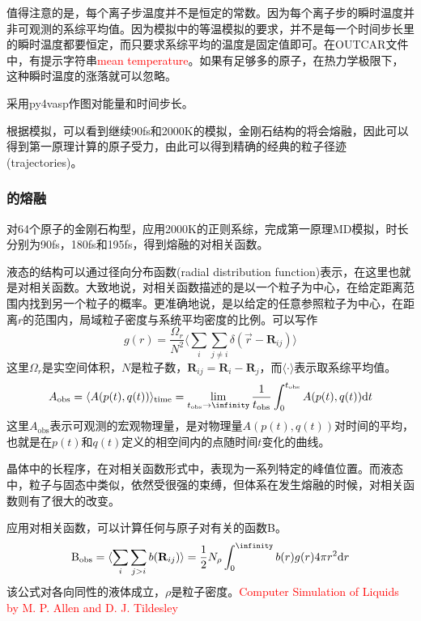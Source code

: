 值得注意的是，每个离子步温度并不是恒定的常数。因为每个离子步的瞬时温度并非可观测的系综平均值。因为模拟中的等温模拟的要求，并不是每一个时间步长里的瞬时温度都要恒定，而只要求系综平均的温度是固定值即可。在\textrm{OUTCAR}文件中，有提示字符串\textcolor{red}{\textrm{mean temperature}}。如果有足够多的原子，在热力学极限下，这种瞬时温度的涨落就可以忽略。

采用\textrm{py4vasp}作图对能量和时间步长。

根据模拟，可以看到继续\textrm{90fs}和\textrm{2000K}的模拟，金刚石结构的将会熔融，因此可以得到第一原理计算的原子受力，由此可以得到精确的经典的粒子径迹\textrm{(trajectories)}。

\subsubsection{的熔融}
对64个原子的金刚石构型，应用\textrm{2000K}的正则系综，完成第一原理\textrm{MD}模拟，时长分别为\textrm{90fs}，\textrm{180fs}和\textrm{195fs}，得到熔融的对相关函数。

液态的结构可以通过径向分布函数\textrm{(radial distribution function)}表示，在这里也就是对相关函数。大致地说，对相关函数描述的是以一个粒子为中心，在给定距离范围内找到另一个粒子的概率。更准确地说，是以给定的任意参照粒子为中心，在距离$r$的范围内，局域粒子密度与系统平均密度的比例。可以写作
\begin{displaymath}
	g(r)=\dfrac{\Omega_r}{N^2}\langle\sum_i\sum_{j\neq i}\delta(\vec r-\mathbf{R}_{ij})\rangle
\end{displaymath}
这里$\Omega_r$是实空间体积，$N$是粒子数，$\mathbf{R}_{ij}=\mathbf{R}_i-\mathbf{R}_j$，而$\langle\cdot\rangle$表示取系综平均值。
\begin{displaymath}
	A_{\mathrm{obs}}=\langle A(p(t),q(t))\rangle_{\mathrm{time}}=\lim_{t_{\mathrm{obs}}\rightarrow\infinity}\dfrac1{t_{\mathrm{obs}}}\int_0^{t_{\mathrm{obs}}}A(p(t),q(t))\mathrm{d}t
\end{displaymath}
这里$A_{\mathrm{obs}}$表示可观测的宏观物理量，是对物理量$A(p(t),q(t))$对时间的平均，也就是在$p(t)$和$q(t)$定义的相空间内的点随时间$t$变化的曲线。

晶体中的长程序，在对相关函数形式中，表现为一系列特定的峰值位置。而液态中，粒子与固态中类似，依然受很强的束缚，但体系在发生熔融的时候，对相关函数则有了很大的改变。

应用对相关函数，可以计算任何与原子对有关的函数\textrm{B}。
\begin{displaymath}
	\mathrm{B}_{\mathrm{obs}}=\langle\sum_i\sum_{j>i}b(\mathbf{R}_{ij})\rangle=\dfrac12N_{\rho}\int_0^{\infinity}b(r)g(r)4\pi r^2\mathrm{d}r
\end{displaymath}
该公式对各向同性的液体成立，$\rho$是粒子密度。\textcolor{red}{Computer Simulation of Liquids by M. P. Allen and D. J. Tildesley}

